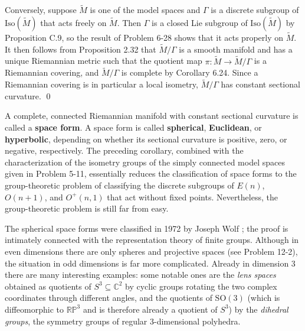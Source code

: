\begin{corollary}
Conversely, suppose $\tilde{M}$ is one of the model spaces and $\Gamma$ is a discrete subgroup of $\text{Iso}(\tilde{M})$ that acts freely on $\tilde{M}$. Then $\Gamma$ is a closed Lie subgroup of $\text{Iso}(\tilde{M})$ by Proposition C.9, so the result of Problem 6-28 shows that it acts properly on $\tilde{M}$. It then follows from Proposition 2.32 that $\tilde{M}/\Gamma$ is a smooth manifold and has a unique Riemannian metric such that the quotient map $\pi : \tilde{M} \to \tilde{M}/\Gamma$ is a Riemannian covering, and $\tilde{M}/\Gamma$ is complete by Corollary 6.24. Since a Riemannian covering is in particular a local isometry, $\tilde{M}/\Gamma$ has constant sectional curvature. \qed
\end{corollary}

A complete, connected Riemannian manifold with constant sectional curvature is called a \textbf{space form}. A space form is called \textbf{spherical}, \textbf{Euclidean}, or \textbf{hyperbolic}, depending on whether its sectional curvature is positive, zero, or negative, respectively. The preceding corollary, combined with the characterization of the isometry groups of the simply connected model spaces given in Problem 5-11, essentially reduces the classification of space forms to the group-theoretic problem of classifying the discrete subgroups of $E(n)$, $O(n+1)$, and $O^+(n,1)$ that act without fixed points. Nevertheless, the group-theoretic problem is still far from easy.

The spherical space forms were classified in 1972 by Joseph Wolf \cite{Wol11}; the proof is intimately connected with the representation theory of finite groups. Although in even dimensions there are only spheres and projective spaces (see Problem 12-2), the situation in odd dimensions is far more complicated. Already in dimension 3 there are many interesting examples: some notable ones are the \emph{lens spaces} obtained as quotients of $S^3 \subseteq \mathbb{C}^2$ by cyclic groups rotating the two complex coordinates through different angles, and the quotients of $\text{SO}(3)$ (which is diffeomorphic to $\mathbb{RP}^3$ and is therefore already a quotient of $S^3$) by the \emph{dihedral groups}, the symmetry groups of regular 3-dimensional polyhedra.

